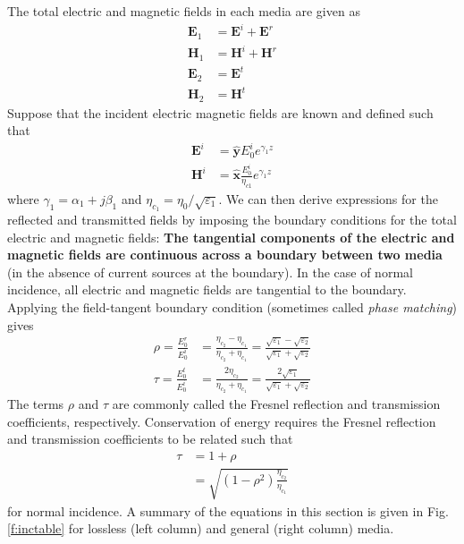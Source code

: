 \documentclass[11pt, oneside]{article}
\begin{document}
The total electric and magnetic fields in each media are given as
	\begin{subequations}
	\label{e:normal_inc1}
	\begin{align}
	\mathbf{E}_1 &= \mathbf{E}^i + \mathbf{E}^r \\
	\mathbf{H}_1 &= \mathbf{H}^i + \mathbf{H}^r \\
	\mathbf{E}_2 &= \mathbf{E}^t \\
	\mathbf{H}_2 &= \mathbf{H}^t 
	\end{align}
	\end{subequations}
Suppose that the incident electric magnetic fields are known and defined such that 
	\begin{subequations}
	\label{e:normal_inc_i1}
	\begin{align}
	\mathbf{E}^i &= \hat{\mathbf{y}}E^i_0e^{\gamma_1z} \\
	\mathbf{H}^i &= \hat{\mathbf{x}}\frac{E^i_0}{\eta_{c1}}e^{\gamma_1z}
	\end{align}
	\end{subequations}
where $\gamma_1 = \alpha_1 + j\beta_1$ and $\eta_{c_1} = \eta_0/\sqrt{\varepsilon_1}$. We can then derive expressions for the reflected and transmitted fields by imposing the boundary conditions for the total electric and magnetic fields: \textbf{The tangential components of the electric and magnetic fields are continuous across a boundary between two media} (in the absence of current sources at the boundary). In the case of normal incidence, all electric and magnetic fields are tangential to the boundary. Applying the field-tangent boundary condition (sometimes called \emph{phase matching}) gives
	\begin{subequations}
	\label{e:normal_inc_rt1}
	\begin{align}
	\rho = \frac{E^r_0}{E^i_0} &= \frac{\eta_{c_2} - \eta_{c_1}}{\eta_{c_2} + \eta_{c_1}} = 
			\frac{\sqrt{\varepsilon_1} - \sqrt{\varepsilon_2}}{\sqrt{\varepsilon_1} + \sqrt{\varepsilon_2}}  \\
	\tau = \frac{E^t_0}{E^i_0} &= \frac{2\eta_{c_2}}{\eta_{c_2} + \eta_{c_1}} = \frac{2\sqrt{\varepsilon_1}}{\sqrt{\varepsilon_1} + \sqrt{\varepsilon_2}}
	\end{align}
	\end{subequations}
The terms $\rho$ and $\tau$ are commonly called the Fresnel reflection and transmission coefficients, respectively. Conservation of energy requires the Fresnel reflection and transmission coefficients to be related such that
	\begin{subequations}
	\label{e:tau_norm}
	\begin{align}
	\tau &= 1 + \rho \\ &= \sqrt{\left(1 - \rho^2\right)\frac{\eta_{c_2}}{\eta_{c_1}}}
	\end{align}
	\end{subequations}
for normal incidence. A summary of the equations in this section is given in Fig. \ref{f:inctable} for lossless (left column) and general (right column) media. 
\end{document}
